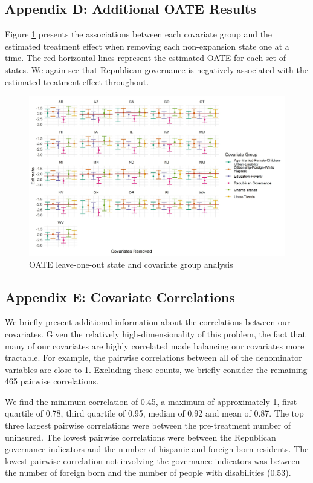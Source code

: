 \documentclass[12pt]{article}
\begin{document}
\subsection{Appendix D: Additional OATE Results}

Figure \ref{oatestate} presents the associations between each covariate group and the estimated treatment effect when removing each non-expansion state one at a time. The red horizontal lines represent the estimated OATE for each set of states. We again see that Republican governance is negatively associated with the estimated treatment effect throughout.

\begin{figure}[H]
\begin{center}
    \includegraphics[scale=0.6]{images/oate-loo-covs-states.jpeg}
    \caption{OATE leave-one-out state and covariate group analysis}
    \label{oatestate}
\end{center}
\end{figure}

\subsection{Appendix E: Covariate Correlations}

We briefly present additional information about the correlations between our covariates. Given the relatively high-dimensionality of this problem, the fact that many of our covariates are highly correlated made balancing our covariates more tractable. For example, the pairwise correlations between all of the denominator variables are close to 1. Excluding these counts, we briefly consider the remaining 465 pairwise correlations.

We find the minimum correlation of 0.45, a maximum of approximately 1, first quartile of 0.78, third quartile of 0.95, median of 0.92 and mean of 0.87. The top three largest pairwise correlations were between the pre-treatment number of uninsured. The lowest pairwise correlations were between the Republican governance indicators and the number of hispanic and foreign born residents. The lowest pairwise correlation not involving the governance indicators was between the number of foreign born and the number of people with disabilities (0.53). 
\end{document}
